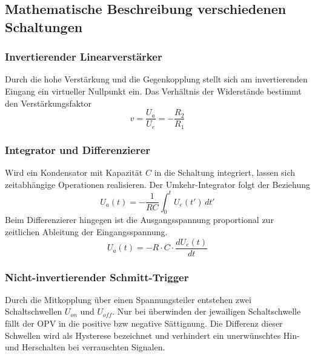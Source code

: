 \subsection{Mathematische Beschreibung verschiedenen Schaltungen}

\subsubsection{Invertierender Linearverstärker}
Durch die hohe Verstärkung und die Gegenkopplung stellt sich am invertierenden Eingang ein virtueller Nullpunkt ein. Das Verhältnis der Widerstände bestimmt den Verstärkungsfaktor
\begin{equation}
    v = \frac{U_a}{U_e} = -\frac{R_2}{R_1}
\end{equation}

\subsubsection{Integrator und Differenzierer}
Wird ein Kondensator mit Kapazität $C$ in die Schaltung integriert, lassen sich zeitabhängige Operationen realisieren. Der Umkehr-Integrator folgt der Beziehung
\begin{equation}
    U_a(t) = -\frac{1}{RC} \int_{0}^{t} U_e(t') \, dt'
\end{equation}
Beim Differenzierer hingegen ist die Ausgangsspannung proportional zur zeitlichen Ableitung der Eingangsspannung.
\begin{equation}
    U_a(t) = -R \cdot C \cdot \frac{d U_e(t)}{dt}
\end{equation}

\subsubsection{Nicht-invertierender Schmitt-Trigger}
Durch die Mitkopplung über einen Spannungsteiler entstehen zwei Schaltschwellen $U_{on}$ und $U_{off}$. Nur bei überwinden der jewailigen Schaltschwelle fällt der OPV in die positive bzw negative Sättignung. Die Differenz dieser Schwellen wird als Hysterese bezeichnet und verhindert ein unerwünschtes Hin- und Herschalten bei verrauschten Signalen.





